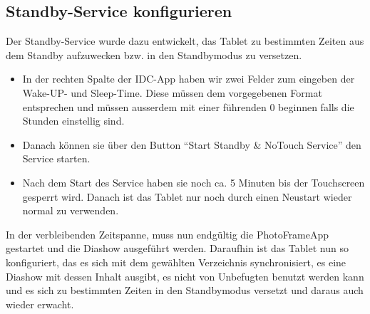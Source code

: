 \begin{flushleft}
  \subsection{Standby-Service konfigurieren}
    Der Standby-Service wurde dazu entwickelt, das Tablet zu bestimmten Zeiten aus dem Standby aufzuwecken bzw. in den Standbymodus zu versetzen.
    \begin{itemize}
      \item In der rechten Spalte der IDC-App haben wir zwei Felder zum eingeben der Wake-UP- und Sleep-Time. Diese müssen dem vorgegebenen Format entsprechen und müssen ausserdem mit einer führenden 0 beginnen falls die Stunden einstellig sind.
      \item Danach können sie über den Button ``Start Standby \& NoTouch Service'' den Service starten.
      \item Nach dem Start des Service haben sie noch ca. 5 Minuten bis der Touchscreen gesperrt wird. Danach ist das Tablet nur noch durch einen Neustart wieder normal zu verwenden.
    \end{itemize}
    In der verbleibenden Zeitspanne, muss nun endgültig die PhotoFrameApp gestartet und die Diashow ausgeführt werden. Daraufhin ist das Tablet nun so konfiguriert, das es sich mit dem gewählten Verzeichnis synchronisiert, es eine Diashow mit dessen Inhalt ausgibt, es nicht von Unbefugten benutzt werden kann und es sich zu bestimmten Zeiten in den Standbymodus versetzt und daraus auch wieder erwacht.
\end{flushleft}
